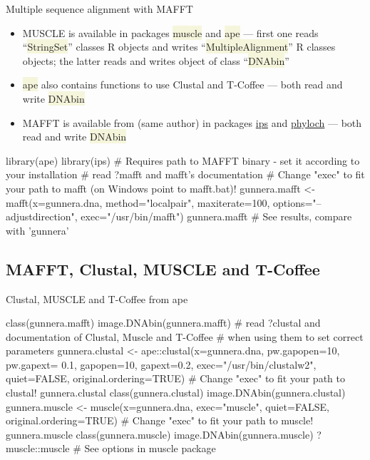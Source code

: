 \documentclass[compress, xelatex, 11pt, xcolor=svgnames, aspectratio=169,
	hyperref={
		bookmarks=true,
		unicode=true,
		colorlinks=true,
		pdftitle={Molecular data in R},
		plainpages=false,
		pdfauthor={Vojtech Zeisek},
		pdfsubject={Course about phylogeny and evolution in R},
		pdfcreator={XeLaTeX},
		pdfkeywords={R, evolution, phylogeny, molecular data},
		linkcolor=Crimson, %
		anchorcolor=Magenta, %
		citecolor=Magenta, %
		filecolor=Magenta, %
		menucolor=Magenta, %
		urlcolor=DodgerBlue, %
		},
	url={hyphens, lowtilde} %
	]{beamer}
\renewcommand{\texttt}[1]{\colorbox{Beige}{{\ttfamily #1}}}
\begin{document}
\begin{frame}[fragile]{Multiple sequence alignment with MAFFT}
	\begin{itemize}
		\item MUSCLE is available in packages \texttt{muscle} and \texttt{ape} --- first one reads \enquote{\texttt{*StringSet}} classes R objects and writes \enquote{\texttt{*MultipleAlignment}} R classes objects; the latter reads and writes object of class \enquote{\texttt{DNAbin}}
		\item \texttt{ape} also contains functions to use Clustal and T-Coffee --- both read and write \texttt{DNAbin}
		\item MAFFT is available from (same author) in packages \href{https://CRAN.R-project.org/package=ips}{ips} and \href{http://www.christophheibl.de/Rpackages.html}{phyloch} --- both read and write \texttt{DNAbin}
	\end{itemize}
	\begin{spluscode}
    library(ape)
    library(ips)
    # Requires path to MAFFT binary - set it according to your installation
    # read ?mafft and mafft's documentation
    # Change "exec" to fit your path to mafft (on Windows point to mafft.bat)!
    gunnera.mafft <- mafft(x=gunnera.dna, method="localpair", maxiterate=100,
      options="--adjustdirection", exec="/usr/bin/mafft")
    gunnera.mafft # See results, compare with 'gunnera'
	\end{spluscode}
\end{frame}

\subsection{MAFFT, Clustal, MUSCLE and T-Coffee}

\begin{frame}[fragile]{Clustal, MUSCLE and T-Coffee from ape}
	\begin{spluscode}
    class(gunnera.mafft)
    image.DNAbin(gunnera.mafft)
    # read ?clustal and documentation of Clustal, Muscle and T-Coffee
    # when using them to set correct parameters
    gunnera.clustal <- ape::clustal(x=gunnera.dna, pw.gapopen=10, pw.gapext=
      0.1, gapopen=10, gapext=0.2, exec="/usr/bin/clustalw2", quiet=FALSE,
      original.ordering=TRUE) # Change "exec" to fit your path to clustal!
    gunnera.clustal
    class(gunnera.clustal)
    image.DNAbin(gunnera.clustal)
    gunnera.muscle <- muscle(x=gunnera.dna, exec="muscle", quiet=FALSE,
      original.ordering=TRUE) # Change "exec" to fit your path to muscle!
    gunnera.muscle
    class(gunnera.muscle)
    image.DNAbin(gunnera.muscle)
    ?muscle::muscle # See options in muscle package
	\end{spluscode}
\end{frame}
\end{document}
